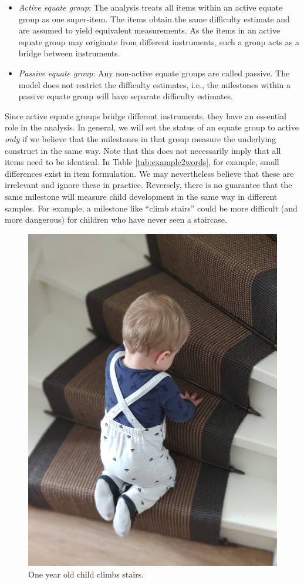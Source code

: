 \documentclass[
]{book}
\providecommand{\tightlist}{%
  \setlength{\itemsep}{0pt}\setlength{\parskip}{0pt}}
\begin{document}
\begin{itemize}
\tightlist
\item
  \emph{Active equate group}: The analysis treats all items within an active equate group as one super-item. The items obtain the same difficulty estimate and are assumed to yield equivalent measurements. As the items in an active equate group may originate from different instruments, such a group acts as a bridge between instruments.
\item
  \emph{Passive equate group}: Any non-active equate groups are called passive. The model does not restrict the difficulty estimates, i.e., the milestones within a passive equate group will have separate difficulty estimates.
\end{itemize}

Since active equate groups bridge different instruments, they have an essential role in the analysis. In general, we will set the status of an equate group to active \emph{only} if we believe that the milestones in that group measure the underlying construct in the same way. Note that this does not necessarily imply that all items need to be identical. In Table \ref{tab:example2words}, for example, small differences exist in item formulation. We may nevertheless believe that these are irrelevant and ignore these in practice. Reversely, there is no guarantee that the same milestone will measure child development in the same way in different samples. For example, a milestone like ``climb stairs'' could be more difficult (and more dangerous) for children who have never seen a staircase.

\begin{figure}

{\centering \includegraphics[width=0.5\linewidth]{fig/otis-stairs} 

}

\caption{One year old child climbs stairs.}\label{fig:stairpic}
\end{figure}
\end{document}
